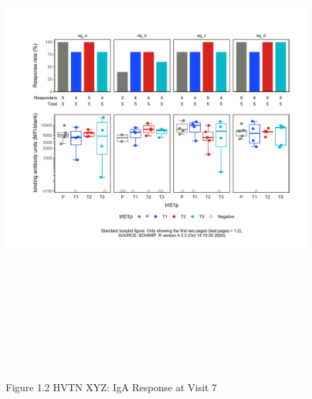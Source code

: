 \documentclass[12pt]{article}
\begin{document}
\clearpage\begin{figure}[H]

{\centering \includegraphics[width=8.75in,height=7.25in]{test_cases_files/figure-latex/unnamed-chunk-2-2} 

}

\caption[Figure 1.2 boxplot (pos. response boxplots)]{Figure 1.2 HVTN XYZ: IgA Response at Visit 7}\label{fig:unnamed-chunk-2-2}
\end{figure}
\clearpage
\end{document}
